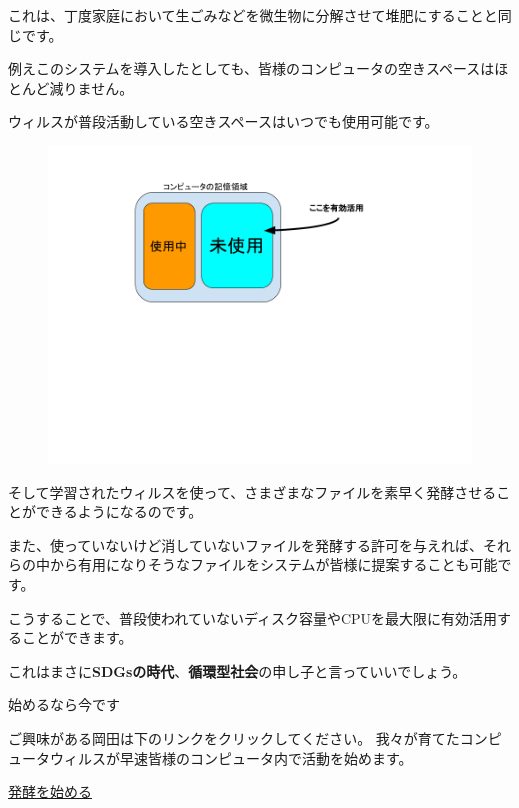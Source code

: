 \documentclass[12pt, unicode]{beamer}
\begin{document}
\begin{frame}

\vspace{1\baselineskip}

これは、丁度家庭において生ごみなどを微生物に分解させて堆肥にすることと同じです。

例えこのシステムを導入したとしても、皆様のコンピュータの空きスペースはほとんど減りません。

ウィルスが普段活動している空きスペースはいつでも使用可能です。

\begin{figure}[htbp]
  \begin{minipage}[b]{0.8\linewidth}
    \centering
    \includegraphics[keepaspectratio, scale=0.3]{fig1.png}
  \end{minipage}
\end{figure}

\end{frame}

\begin{frame}

そして学習されたウィルスを使って、さまざまなファイルを素早く発酵させることができるようになるのです。

また、使っていないけど消していないファイルを発酵する許可を与えれば、それらの中から有用になりそうなファイルをシステムが皆様に提案することも可能です。

\end{frame}

\begin{frame}

こうすることで、普段使われていないディスク容量やCPUを最大限に有効活用することができます。

これはまさに\textbf{SDGsの時代}、\textbf{循環型社会}の申し子と言っていいでしょう。

\end{frame}

\begin{frame}{始めるなら今です}

ご興味がある岡田は下のリンクをクリックしてください。
我々が育てたコンピュータウィルスが早速皆様のコンピュータ内で活動を始めます。

{\color{blue}
\href{https://google.com}{\underline{発酵を始める}}
}

\end{frame}
\end{document}
